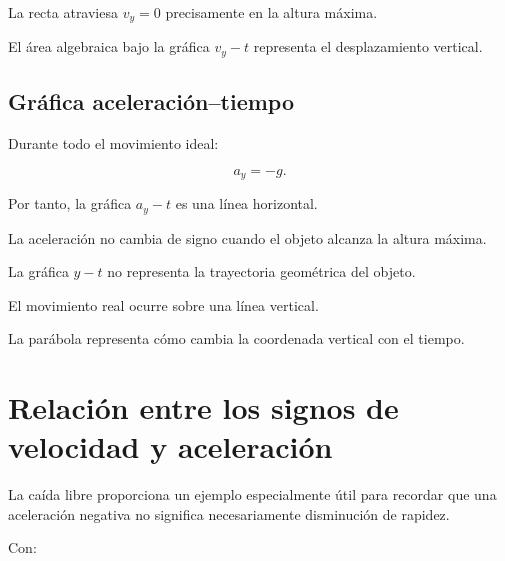 La recta atraviesa \(v_y=0\) precisamente en la altura máxima.

El área algebraica bajo la gráfica \(v_y-t\) representa el desplazamiento vertical.


\subsection{Gráfica aceleración--tiempo}

Durante todo el movimiento ideal:

\[ a_y=-g. \]

Por tanto, la gráfica \(a_y-t\) es una línea horizontal.

\begin{center}
\end{center}

La aceleración no cambia de signo cuando el objeto alcanza la altura máxima.

\begin{errorfrecuente}
La gráfica \(y-t\) no representa la trayectoria geométrica del objeto.

El movimiento real ocurre sobre una línea vertical.

La parábola representa cómo cambia la coordenada vertical con el tiempo.
\end{errorfrecuente}


\section{Relación entre los signos de velocidad y aceleración}

La caída libre proporciona un ejemplo especialmente útil para recordar que una aceleración negativa no significa necesariamente disminución de rapidez.

Con:

